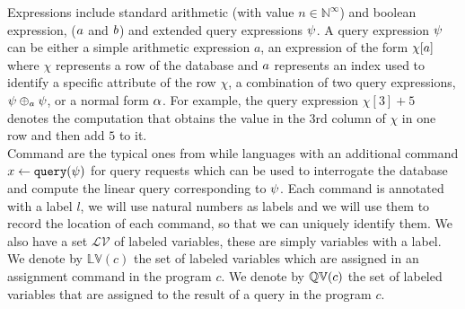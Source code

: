 Expressions include
standard arithmetic (with value $n \in \mathbb{N}^{\infty}$) and boolean expression, ($a$ and $b$) and extended query expressions $\psi$.
A query expression $\psi$ can be either a simple arithmetic expression $a$, an expression of the form $\chi[a]$ where $\chi$ represents a row of the database  and  $a$ represents an index used to identify a specific attribute of the row $\chi$, a combination of two query expressions, $\psi \oplus_{a} \psi$, or a normal form $\alpha$.
For example, the query expression $\chi[3] + 5$  denotes the computation that
obtains
the value in the $3$rd column of $\chi$ in one row and then add $5$ to it.
\\
Command are the typical ones from while languages with an additional command $\mathrel{ x \leftarrow {\tt query}(\psi) }$ for query requests which can be used to interrogate the database and compute the linear query corresponding to $\psi$.
Each command is annotated with a label $l$, we will use natural numbers as labels and we will use them to record
the location of each command, so that we can uniquely identify them.
We also have a set $\mathcal{LV}$  of labeled variables, these are simply variables with a label.
We denote by $\mathbb{LV}(c)$ the set of labeled variables which are assigned in an assignment command in the program $c$.  
We denote by  $\mathbb{QV}(c)$ the set of labeled variables that are assigned to the result of a query in the program $c$. 



